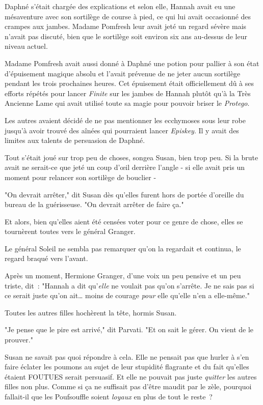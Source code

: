 Daphné s'était chargée des explications et selon elle, Hannah avait eu une mésaventure avec son sortilège de course à pied, ce qui lui avait occasionné des crampes aux jambes. Madame Pomfresh leur avait jeté un regard sévère mais n'avait pas discuté, bien que le sortilège soit environ six ans au-dessus de leur niveau actuel.

Madame Pomfresh avait aussi donné à Daphné une potion pour pallier à son état d'épuisement magique absolu et l'avait prévenue de ne jeter aucun sortilège pendant les trois prochaines heures. Cet épuisement était officiellement dû à ses efforts répétés pour lancer \emph{Finite} sur les jambes de Hannah plutôt qu'à la Très Ancienne Lame qui avait utilisé toute sa magie pour pouvoir briser le \emph{Protego}.

Les autres avaient décidé de ne pas mentionner les ecchymoses sous leur robe jusqu'à avoir trouvé des aînées qui pourraient lancer \emph{Episkey}. Il y avait des limites aux talents de persuasion de Daphné.

Tout s'était joué sur trop peu de choses, songea Susan, bien trop peu. Si la brute avait ne serait-ce que jeté un coup d'œil derrière l'angle - si elle avait pris un moment pour relancer son sortilège de bouclier -

"On devrait arrêter," dit Susan dès qu'elles furent hors de portée d'oreille du bureau de la guérisseuse. "On devrait arrêter de faire ça."

Et alors, bien qu'elles aient été censées voter pour ce genre de chose, elles se tournèrent toutes vers le général Granger.

Le général Soleil ne sembla pas remarquer qu'on la regardait et continua, le regard braqué vers l'avant.

Après un moment, Hermione Granger, d'une voix un peu pensive et un peu triste, dit~: "Hannah a dit qu'\emph{elle} ne voulait pas qu'on s'arrête. Je ne sais pas si ce serait juste qu'on ait… moins de courage \emph{pour} elle qu'elle n'en a elle-même."

Toutes les autres filles hochèrent la tête, hormis Susan.

"Je pense que le pire est arrivé," dit Parvati. "Et on sait le gérer. On vient de le prouver."

Susan ne savait pas quoi répondre à cela. Elle ne pensait pas que hurler à s'en faire éclater les poumons au sujet de leur stupidité flagrante et du fait qu'elles étaient FOUTUES serait persuasif. Et elle ne pouvait pas juste \emph{quitter} les autres filles non plus. Comme si ça ne suffisait pas d'être maudit par le zèle, pourquoi fallait-il que les Poufsouffle soient \emph{loyaux} en plus de tout le reste~?

